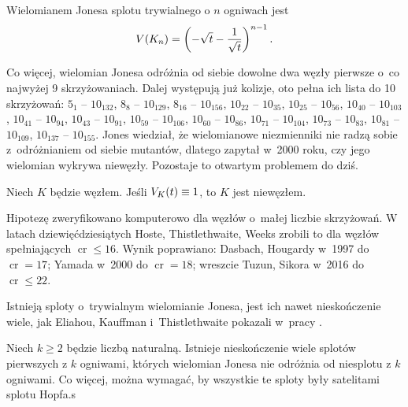 \begin{proposition}
\label{prp:jones_trivial_link}
    Wielomianem Jonesa splotu trywialnego o $n$ ogniwach jest
    \begin{equation}
        V(K_n) = \left(-\sqrt{t} - \frac{1}{\sqrt {t}}\right)^{n-1}.
    \end{equation}
\end{proposition}

Co więcej, wielomian Jonesa odróżnia od siebie dowolne dwa węzły pierwsze o~co najwyżej 9 skrzyżowaniach.
Dalej występują już kolizje, oto pełna ich lista do 10 skrzyżowań:
$5_{1}$ -- $10_{132}$,
$8_{8}$ -- $10_{129}$,
$8_{16}$ -- $10_{156}$,
$10_{22}$ -- $10_{35}$,
$10_{25}$ -- $10_{56}$,
$10_{40}$ -- $10_{103}$,
$10_{41}$ -- $10_{94}$,
$10_{43}$ -- $10_{91}$,
$10_{59}$ -- $10_{106}$,
$10_{60}$ -- $10_{86}$,
$10_{71}$ -- $10_{104}$,
$10_{73}$ -- $10_{83}$,
$10_{81}$ -- $10_{109}$,
$10_{137}$ -- $10_{155}$.
Jones wiedział, że wielomianowe niezmienniki nie radzą sobie z~odróżnianiem od siebie mutantów, dlatego zapytał w~2000 roku, czy jego wielomian wykrywa niewęzły.
Pozostaje to otwartym problemem do dziś.

\begin{conjecture} \label{jones_conjecture}
    Niech $K$ będzie węzłem.
    Jeśli $V_K(t) \equiv 1$, to $K$ jest niewęzłem.
\end{conjecture}

Hipotezę zweryfikowano komputerowo dla węzłów o~małej liczbie skrzyżowań.
W latach dziewięćdziesiątych Hoste, Thistlethwaite, Weeks zrobili to dla węzłów spełniających $\operatorname{cr} \le 16$.
Wynik poprawiano: Dasbach, Hougardy w~1997 do $\operatorname{cr} = 17$; Yamada w~2000 do $\operatorname{cr} = 18$; wreszcie Tuzun, Sikora w~2016 do $\operatorname{cr} \le 22$.


Istnieją sploty o~trywialnym wielomianie Jonesa, jest ich nawet nieskończenie wiele, jak Eliahou, Kauffman i~Thistlethwaite pokazali w~pracy \cite{eliahou03}.

\begin{proposition}
    Niech $k \ge 2$ będzie liczbą naturalną.
    Istnieje nieskończenie wiele splotów pierwszych z $k$ ogniwami, których wielomian Jonesa nie odróżnia od niesplotu z $k$ ogniwami.
    Co więcej, można wymagać, by wszystkie te sploty były satelitami splotu Hopfa.s
\end{proposition}

